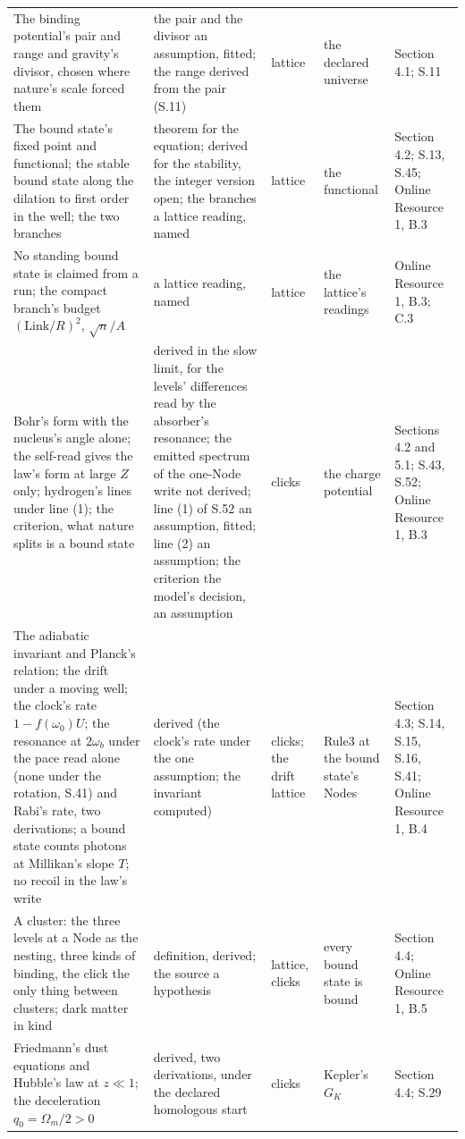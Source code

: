 \documentclass[pdflatex,sn-mathphys-num]{sn-jnl}
\theoremstyle{thmstyleone}
\begin{document}
\begin{footnotesize}
\begin{longtable}{L{4.3cm}L{2.4cm}L{1.2cm}L{2.0cm}L{2.0cm}}
The binding potential's pair and range and gravity's divisor, chosen where nature's scale forced them & the pair and the divisor an assumption, fitted; the range derived from the pair (S.11) & lattice & the declared universe & Section 4.1; S.11\\
The bound state's fixed point and functional; the stable bound state along the dilation to first order in the well; the two branches & theorem for the equation; derived for the stability, the integer version open; the branches a lattice reading, named & lattice & the functional & Section 4.2; S.13, S.45; Online Resource 1, B.3\\
No standing bound state is claimed from a run; the compact branch's budget $(\mathrm{Link} / R)^2$, $\sqrt n / A$ & a lattice reading, named & lattice & the lattice's readings & Online Resource 1, B.3; C.3\\
Bohr's form with the nucleus's angle alone; the self-read gives the law's form at large $Z$ only; hydrogen's lines under line (1); the criterion, what nature splits is a bound state & derived in the slow limit, for the levels' differences read by the absorber's resonance; the emitted spectrum of the one-Node write not derived; line (1) of S.52 an assumption, fitted; line (2) an assumption; the criterion the model's decision, an assumption & clicks & the charge potential & Sections 4.2 and 5.1; S.43, S.52; Online Resource 1, B.3\\
The adiabatic invariant and Planck's relation; the drift under a moving well; the clock's rate $1 - f(\omega_0)U$; the resonance at $2\omega_b$ under the pace read alone (none under the rotation, S.41) and Rabi's rate, two derivations; a bound state counts photons at Millikan's slope $T$; no recoil in the law's write & derived (the clock's rate under the one assumption; the invariant computed) & clicks; the drift lattice & Rule3 at the bound state's Nodes & Section 4.3; S.14, S.15, S.16, S.41; Online Resource 1, B.4\\
A cluster: the three levels at a Node as the nesting, three kinds of binding, the click the only thing between clusters; dark matter in kind & definition, derived; the source a hypothesis & lattice, clicks & every bound state is bound & Section 4.4; Online Resource 1, B.5\\
Friedmann's dust equations and Hubble's law at $z \ll 1$; the deceleration $q_0 = \Omega_m / 2 > 0$ & derived, two derivations, under the declared homologous start & clicks & Kepler's $G_K$ & Section 4.4; S.29\\

\end{longtable}
\end{footnotesize}
\end{document}
